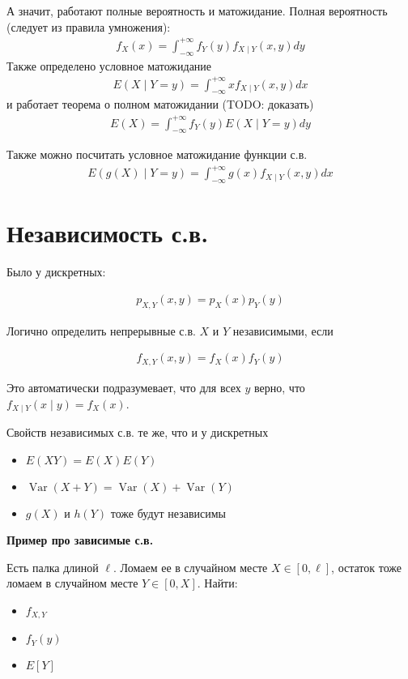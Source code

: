 \documentclass[12pt]{article}
\DeclareMathOperator{\Var}{Var}
\begin{document}
А значит, работают полные вероятность и матожидание. Полная вероятность (следует из правила умножения):
\begin{align*}
  f_X(x) = \int_{-\infty}^{+\infty} f_Y(y) f_{X \mid Y}(x, y) dy
\end{align*}
Также определено условное матожидание
\begin{align*}
  E(X \mid Y = y) = \int_{-\infty}^{+\infty} x f_{X \mid Y}(x, y) dx
\end{align*}
и работает теорема о полном матожидании (TODO: доказать)
\begin{align*}
  E(X) = \int_{-\infty}^{+\infty} f_{Y}(y)E(X \mid Y = y) dy
\end{align*}

Также можно посчитать условное матожидание функции с.в.
\begin{align*}
  E(g(X) \mid Y = y) = \int_{-\infty}^{+\infty} g(x) f_{X \mid Y}(x, y) dx
\end{align*}

\section{Независимость с.в.}

Было у дискретных:

\begin{align*}
  p_{X, Y}(x, y) = p_X(x)p_Y(y)
\end{align*}

Логично определить непрерывные с.в. $X$ и $Y$ независимыми, если

\begin{align*}
  f_{X, Y}(x, y) = f_X(x) f_Y(y)
\end{align*}

Это автоматически подразумевает, что для всех $y$ верно, что $f_{X \mid Y}(x \mid y) = f_X(x)$.

Свойств независимых с.в. те же, что и у дискретных
\begin{itemize}
  \item $E(XY) = E(X) E(Y)$
  \item $\Var(X + Y) = \Var(X) + \Var(Y)$
  \item $g(X)$ и $h(Y)$ тоже будут независимы  
\end{itemize}

\textbf{Пример про зависимые с.в.}

Есть палка длиной $\ell$. Ломаем ее в случайном месте $X\in [0, \ell]$, остаток тоже ломаем в случайном месте $Y \in [0, X]$. Найти:
\begin{itemize}
  \item $f_{X, Y}$ 
  \item $f_Y(y)$
  \item $E[Y]$
\end{itemize}
\end{document}
